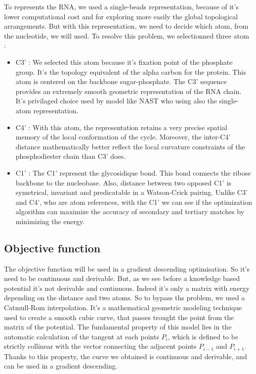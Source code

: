 \documentclass[11pt,a4paper]{article}
\begin{document}
To represents the RNA, we used a single-beads representation, because of it's lower computational cost and for exploring more easily the global topological arrangements. But with this representation, we need to decide which atom, from the nucleotide, we will used. To resolve this problem, we selectionned three atom : 
\begin{itemize}
    \item C3' : We selected this atom because it's fixation point of the phosphate group. It's the topology equivalent of the alpha carbon for the protein. This atom is centered on the backbone sugar-phosphate. The C3' sequence provides an extremely smooth geometric representation of the RNA chain. It's privilaged choice used by model like NAST \cite{jonikas_coarse-grained_2009} who using also the single-atom representation.
    \item C4' : With this atom, the representation retains a very precise spatial memory of the local conformation of the cycle. Moreover, the inter-C4' distance mathematically better reflect the local curvature constraints of the phosphodiester chain than C3' does. 
    \item C1' : The C1' represent the glycosidique bond. This bond connects the ribose backbone to the nucleobase. Also, distance between two opposed C1' is symetrical, invariant and predicatable in a Watson-Crick pairing. Unlike C3' and C4', who are atom references, with the C1' we can see if the optimization algorithm can maximize the accuracy of secondary and tertiary matches by minimizing the energy. 
\end{itemize}


\subsection{Objective function}

The objective function will be used in a gradient descending optimisation. So it's need to be continuous and derivable. But, as we see before a knowledge based potential it's not derivable and continuous. Indeed it's only a matrix with energy depending on the distance and two atoms. So to bypass ths problem, we used a Catmull-Rom interpolation. It's a mathematical geometric modeling technique used to create a smooth cubic curve, that passes trought the point from the matrix of the potential. The fundamental property of this model lies in the automatic calculation of the tangent at each points $P_i$, which is defined to be strictly collinear with the vector connecting the adjacent points $P_{i-1}$ and $P_{i+1}$. Thanks to this property, the curve we obtained is continuous and derivable, and can be used in a gradient descending.
\end{document}
